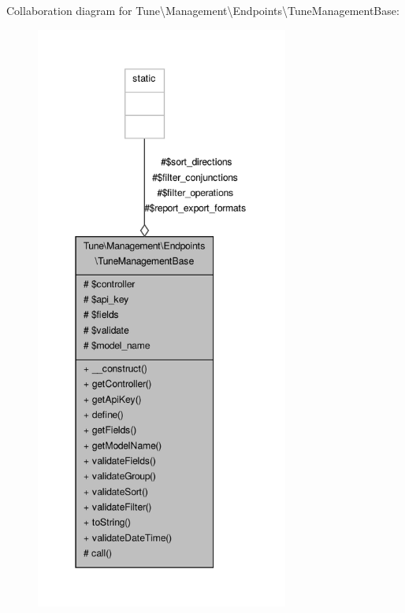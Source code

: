 Collaboration diagram for Tune\textbackslash{}Management\textbackslash{}Endpoints\textbackslash{}Tune\-Management\-Base\-:
\nopagebreak
\begin{figure}[H]
\begin{center}
\leavevmode
\includegraphics[height=550pt]{classTune_1_1Management_1_1Endpoints_1_1TuneManagementBase__coll__graph}
\end{center}
\end{figure}
